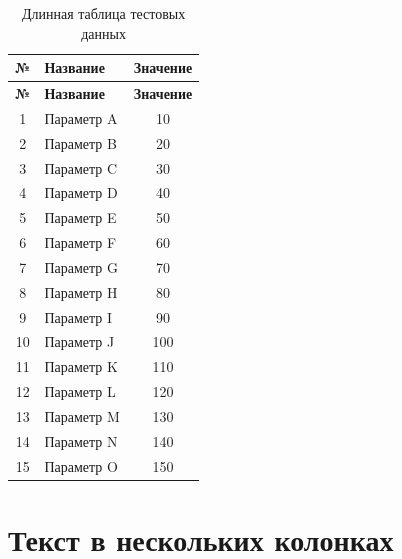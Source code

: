 \documentclass[12pt,a4paper]{article}
\theoremstyle{definition}
\theoremstyle{remark}
\begin{document}
\begin{longtable}{|c|l|c|}
    \caption{Длинная таблица тестовых данных}\\
    \hline
    \textbf{№} & \textbf{Название} & \textbf{Значение}\\
    \hline
    \endfirsthead

    \hline
    \textbf{№} & \textbf{Название} & \textbf{Значение}\\
    \hline
    \endhead

    1 & Параметр A & 10\\ \hline
    2 & Параметр B & 20\\ \hline
    3 & Параметр C & 30\\ \hline
    4 & Параметр D & 40\\ \hline
    5 & Параметр E & 50\\ \hline
    6 & Параметр F & 60\\ \hline
    7 & Параметр G & 70\\ \hline
    8 & Параметр H & 80\\ \hline
    9 & Параметр I & 90\\ \hline
    10 & Параметр J & 100\\ \hline
    11 & Параметр K & 110\\ \hline
    12 & Параметр L & 120\\ \hline
    13 & Параметр M & 130\\ \hline
    14 & Параметр N & 140\\ \hline
    15 & Параметр O & 150\\ \hline
\end{longtable}


\section{Текст в нескольких колонках}
\end{document}
